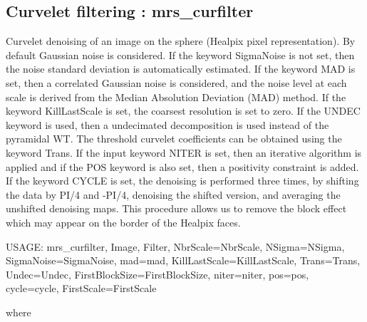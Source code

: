 \subsection{Curvelet filtering : mrs\_curfilter}
Curvelet denoising of an image on the sphere (Healpix pixel representation). By default Gaussian noise is considered. 
If the keyword SigmaNoise is not set, then the noise standard deviation is automatically estimated. If the keyword MAD 
is set, then a correlated Gaussian noise is considered, and the noise level at each scale is derived from the Median 
Absolution Deviation (MAD) method. If the keyword KillLastScale is set, the coarsest resolution is set to zero. If the 
UNDEC keyword is used, then a undecimated decomposition is used instead of the pyramidal WT. The threshold curvelet 
coefficients can be obtained using the keyword Trans. If the input keyword NITER is set, then an iterative algorithm is 
applied and if the POS keyword is also set, then a positivity constraint is added. If the keyword CYCLE is set, the denoising 
is performed three times, by shifting the data by PI/4 and -PI/4, denoising the shifted version, and averaging the unshifted 
denoising maps. This procedure allows us to remove the block effect which may appear on the border of the Healpix faces.
{\bf
\begin{center}
     USAGE:  mrs\_curfilter, Image, Filter, NbrScale=NbrScale, NSigma=NSigma, SigmaNoise=SigmaNoise, mad=mad, KillLastScale=KillLastScale, 
     						Trans=Trans, Undec=Undec, FirstBlockSize=FirstBlockSize, niter=niter, pos=pos, cycle=cycle, FirstScale=FirstScale   
\end{center}}
where
